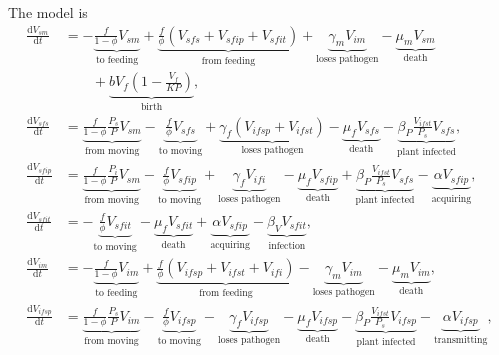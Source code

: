 \documentclass{article}
\newcommand{\md}{\mathrm{d}}
\begin{document}
The model is
\begin{equation}
  \label{odesystem}
  \begin{split}
    \frac{\md V_{sm}}{\md t}
    &=
    - \underbrace{\frac{f}{1 - \phi} V_{sm}}_{\text{to feeding}}
    + \underbrace{\frac{f}{\phi} (V_{sfs} + V_{sfip} + V_{sfit})}_{\text{from feeding}}
    + \underbrace{\gamma_m V_{im}}_{\text{loses pathogen}}
    - \underbrace{\mu_m V_{sm}}_{\text{death}}
    \\ & \quad\quad {}
    + \underbrace{b V_f \left(1 - \frac{V_f}{K P}\right)}_{\text{birth}},
    \\
    \frac{\md V_{sfs}}{\md t}
    &=
    \underbrace{\frac{f}{1 - \phi} \frac{P_s}{P} V_{sm}}_{\text{from moving}}
    - \underbrace{\frac{f}{\phi} V_{sfs}}_{\text{to moving}}
    + \underbrace{\gamma_f (V_{ifsp} + V_{ifst})}_{\text{loses pathogen}}
    - \underbrace{\mu_f V_{sfs}}_{\text{death}}
    - \underbrace{\beta_P \frac{V_{ifst}}{P_s} V_{sfs}}_{\text{plant
        infected}},
    \\
    \frac{\md V_{sfip}}{\md t}
    &=
    \underbrace{\frac{f}{1 - \phi} \frac{P_i}{P} V_{sm}}_{\text{from moving}}
    - \underbrace{\frac{f}{\phi} V_{sfip}}_{\text{to moving}}
    + \underbrace{\gamma_f V_{ifi}}_{\text{loses pathogen}}
    - \underbrace{\mu_f V_{sfip}}_{\text{death}}
    + \underbrace{\beta_P \frac{V_{ifst}}{P_s} V_{sfs}}_{\text{plant infected}}
    - \underbrace{\alpha V_{sfip}}_{\text{acquiring}},
    \\
    \frac{\md V_{sfit}}{\md t}
    &=
    - \underbrace{\frac{f}{\phi} V_{sfit}}_{\text{to moving}}
    - \underbrace{\mu_f V_{sfit}}_{\text{death}}
    + \underbrace{\alpha V_{sfip}}_{\text{acquiring}}
    - \underbrace{\beta_V V_{sfit}}_{\text{infection}},
    \\
    \frac{\md V_{im}}{\md t}
    &=
    - \underbrace{\frac{f}{1 - \phi} V_{im}}_{\text{to feeding}}
    + \underbrace{\frac{f}{\phi} (V_{ifsp} + V_{ifst} + V_{ifi})}_{\text{from feeding}}
    - \underbrace{\gamma_m V_{im}}_{\text{loses pathogen}}
    - \underbrace{\mu_m V_{im}}_{\text{death}},
    \\
    \frac{\md V_{ifsp}}{\md t}
    &=
    \underbrace{\frac{f}{1 - \phi} \frac{P_s}{P} V_{im}}_{\text{from moving}}
    - \underbrace{\frac{f}{\phi} V_{ifsp}}_{\text{to moving}}
    - \underbrace{\gamma_f V_{ifsp}}_{\text{loses pathogen}}
    - \underbrace{\mu_f V_{ifsp}}_{\text{death}}
    - \underbrace{\beta_P \frac{V_{ifst}}{P_s} V_{ifsp}}_{\text{plant infected}}
    - \underbrace{\alpha V_{ifsp}}_{\text{transmitting}},

\end{split}
\end{equation}
\end{document}
